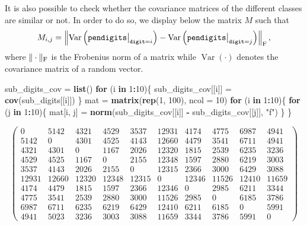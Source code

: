\documentclass[
]{article}
\newenvironment{Shaded}{\begin{snugshade}}{\end{snugshade}}
\newcommand{\AttributeTok}[1]{\textcolor[rgb]{0.13,0.29,0.53}{#1}}
\newcommand{\ControlFlowTok}[1]{\textcolor[rgb]{0.13,0.29,0.53}{\textbf{#1}}}
\newcommand{\DecValTok}[1]{\textcolor[rgb]{0.00,0.00,0.81}{#1}}
\newcommand{\FunctionTok}[1]{\textcolor[rgb]{0.13,0.29,0.53}{\textbf{#1}}}
\newcommand{\NormalTok}[1]{#1}
\newcommand{\OtherTok}[1]{\textcolor[rgb]{0.56,0.35,0.01}{#1}}
\newcommand{\SpecialCharTok}[1]{\textcolor[rgb]{0.81,0.36,0.00}{\textbf{#1}}}
\newcommand{\StringTok}[1]{\textcolor[rgb]{0.31,0.60,0.02}{#1}}
\theoremstyle{plain}
\begin{document}
It is also possible to check whether the covariance matrices of the
different classes are similar or not. In order to do so, we display
below the matrix \(M\) such that \[
    M_{i,j} = \left\|\operatorname{Var}\left(\text{\texttt{pendigits}} \big|_{\text{\texttt{digit}} = i}\right) - \operatorname{Var}\left(\text{\texttt{pendigits}} \big|_{\text{\texttt{digit}} = j}\right)\right\|_{\rm{F}},
\] where \(\|\cdot\|_{\rm{F}}\) is the Frobenius norm of a matrix while
\(\operatorname{Var}\left(\cdot\right)\) denotes the covariance matrix
of a random vector.

\smallskip

\begin{Shaded}
\begin{Highlighting}[]
\NormalTok{sub\_digits\_cov }\OtherTok{=} \FunctionTok{list}\NormalTok{()}
\ControlFlowTok{for}\NormalTok{ (i }\ControlFlowTok{in} \DecValTok{1}\SpecialCharTok{:}\DecValTok{10}\NormalTok{)\{}
\NormalTok{    sub\_digits\_cov[[i]] }\OtherTok{=} \FunctionTok{cov}\NormalTok{(sub\_digits[[i]])}
\NormalTok{\}}
\NormalTok{mat }\OtherTok{=} \FunctionTok{matrix}\NormalTok{(}\FunctionTok{rep}\NormalTok{(}\DecValTok{1}\NormalTok{, }\DecValTok{100}\NormalTok{), }\AttributeTok{ncol =} \DecValTok{10}\NormalTok{)}
\ControlFlowTok{for}\NormalTok{ (i }\ControlFlowTok{in} \DecValTok{1}\SpecialCharTok{:}\DecValTok{10}\NormalTok{)\{}
    \ControlFlowTok{for}\NormalTok{ (j }\ControlFlowTok{in} \DecValTok{1}\SpecialCharTok{:}\DecValTok{10}\NormalTok{)\{}
\NormalTok{        mat[i, j] }\OtherTok{=} \FunctionTok{norm}\NormalTok{(sub\_digits\_cov[[i]] }\SpecialCharTok{{-}}\NormalTok{ sub\_digits\_cov[[j]], }\StringTok{"f"}\NormalTok{)}
\NormalTok{    \}}
\NormalTok{\}}
\end{Highlighting}
\end{Shaded}

\[
    \begin{pmatrix}
            0 &  5142 &  4321 &  4529 &  3537 & 12931 &  4174 &  4775 &  6987 &  4941 \\
         5142 &     0 &  4301 &  4525 &  4143 & 12660 &  4479 &  3541 &  6711 &  4941 \\
         4321 &  4301 &     0 &  1167 &  2026 & 12320 &  1815 &  2539 &  6235 &  3236 \\
         4529 &  4525 &  1167 &     0 &  2155 & 12348 &  1597 &  2880 &  6219 &  3003 \\
         3537 &  4143 &  2026 &  2155 &     0 & 12315 &  2366 &  3000 &  6429 &  3088 \\
        12931 & 12660 & 12320 & 12348 & 12315 &     0 & 12346 & 11526 & 12410 & 11659 \\
         4174 &  4479 &  1815 &  1597 &  2366 & 12346 &     0 &  2985 &  6211 &  3344 \\
         4775 &  3541 &  2539 &  2880 &  3000 & 11526 &  2985 &     0 &  6185 &  3786 \\
         6987 &  6711 &  6235 &  6219 &  6429 & 12410 &  6211 &  6185 &     0 &  5991 \\
         4941 &  5023 &  3236 &  3003 &  3088 & 11659 &  3344 &  3786 &  5991 &     0
    \end{pmatrix}
\]
\end{document}
